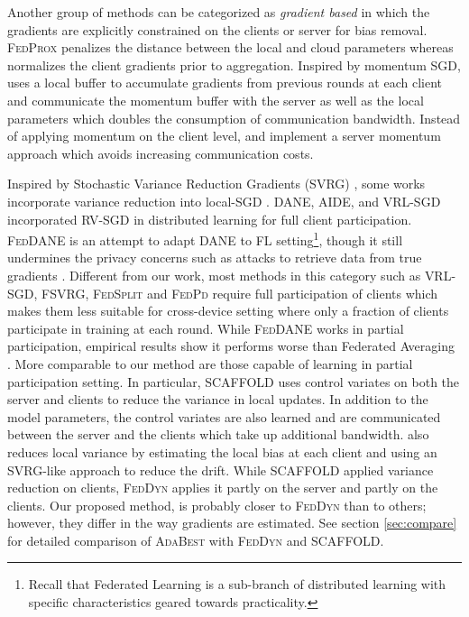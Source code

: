 \documentclass[runningheads]{llncs}
\newcommand{\scaffold}{\textsc{SCAFFOLD}\xspace}
\newcommand{\fedprox}{\textsc{FedProx}\xspace}
\newcommand{\fedsplit}{\textsc{FedSplit}\xspace}
\newcommand{\fedpd}{\textsc{FedPd}\xspace}
\newcommand{\feddyn}{\textsc{FedDyn}\xspace}
\newcommand{\ours}{\textsc{AdaBest}\xspace}
\newcommand{\vrlsgd}{\textsc{VRL-SGD}\xspace}
\newcommand{\fsvrg}{\textsc{FSVRG}\xspace}
\newcommand{\dane}{\textsc{DANE}\xspace}
\newcommand{\aide}{\textsc{AIDE}\xspace}
\newcommand{\feddane}{\textsc{FedDANE}\xspace}
\newcommand{\rvsgd}{\textsc{RV-SGD}\xspace}
\newcommand{\svrg}{\textsc{SVRG}\xspace}
\begin{document}
Another group of methods can be categorized as {\it gradient based} in which the gradients are explicitly constrained on the clients or server for bias removal. \fedprox \cite{li2020federated} penalizes the distance between the local and cloud parameters whereas \cite{wang2020tackling} normalizes the client gradients prior to aggregation. Inspired by momentum SGD, \cite{yu2019linear} uses a local buffer to accumulate gradients from previous rounds at each client and communicate the momentum buffer with the server as well as the local parameters which doubles the consumption of communication bandwidth. Instead of applying momentum on the client level, \cite{hsu2019measuring} and \cite{wang2019slowmo} implement a server momentum approach which avoids increasing communication costs. 

Inspired by Stochastic Variance Reduction Gradients (\svrg) \cite{johnson2013accelerating}, some works incorporate variance reduction into local-SGD \cite{acar2021federated,li2019feddane,karimireddy2020scaffold,liang2019variance,zhang2020fedpd,konevcny2016federated,murata2021bias,nguyen2017sarah}. \dane\cite{shamir2014communication}, \aide\cite{reddi2016aide}, and \vrlsgd\cite{liang2019variance} incorporated \rvsgd in distributed learning for full client participation. \feddane\cite{li2019feddane} is an attempt to adapt \dane to FL setting\footnote{Recall that Federated Learning is a sub-branch of distributed learning with specific characteristics geared towards practicality\cite{mcmahan2017communication}.}, though it still undermines the privacy concerns such as attacks to retrieve data from true gradients \cite{zhu2020deep}. 
Different from our work, most methods in this category such as \vrlsgd \cite{liang2019variance}, \fsvrg \cite{konevcny2016federated}, \fedsplit \cite{pathak2020fedsplit} and \fedpd \cite{zhang2020fedpd} require full participation of clients which makes them less suitable for cross-device setting where only a fraction of clients participate in training at each round. While \feddane \cite{li2019feddane} works in partial participation, empirical results show it performs worse than Federated Averaging \cite{acar2021federated}. 
More comparable to our method are those capable of learning in partial participation setting. In particular, \scaffold \cite{karimireddy2020scaffold} uses control variates on both the server and clients to reduce the variance in local updates. In addition to the model parameters, the control variates are also learned and are communicated between the server and the clients which take up additional bandwidth. \cite{murata2021bias} also reduces local variance by estimating the local bias at each client and using an \svrg-like approach to reduce the drift.
While \scaffold applied variance reduction on clients, \feddyn \cite{acar2021federated} applies it partly on the server and partly on the clients.  
Our proposed method, is probably closer to \feddyn than to others; however, they differ in the way gradients are estimated. See section \ref{sec:compare} for detailed comparison of \ours with \feddyn and \scaffold. 
\end{document}
